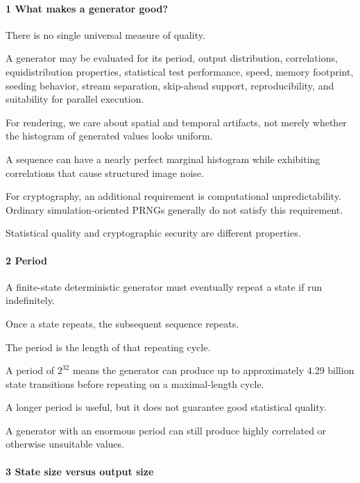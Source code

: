 \paragraph{1 What makes a generator good?}\label{02-foundations-ii-ch029-what-makes-a-generator-good}

\hypertarget{02-foundations-ii-ch029-what-makes-a-generator-good}{}

There is no single universal measure of quality.

A generator may be evaluated for its period, output distribution, correlations, equidistribution properties, statistical test performance, speed, memory footprint, seeding behavior, stream separation, skip-ahead support, reproducibility, and suitability for parallel execution.

For rendering, we care about spatial and temporal artifacts, not merely whether the histogram of generated values looks uniform.

A sequence can have a nearly perfect marginal histogram while exhibiting correlations that cause structured image noise.

For cryptography, an additional requirement is computational unpredictability. Ordinary simulation-oriented PRNGs generally do not satisfy this requirement.

Statistical quality and cryptographic security are different properties.

\paragraph{2 Period}\label{02-foundations-ii-ch029-period}

\hypertarget{02-foundations-ii-ch029-period}{}

A finite-state deterministic generator must eventually repeat a state if run indefinitely.

Once a state repeats, the subsequent sequence repeats.

The period is the length of that repeating cycle.

A period of \(2^{32}\) means the generator can produce up to approximately 4.29 billion state transitions before repeating on a maximal-length cycle.

A longer period is useful, but it does not guarantee good statistical quality.

A generator with an enormous period can still produce highly correlated or otherwise unsuitable values.

\paragraph{3 State size versus output size}\label{02-foundations-ii-ch029-state-size-versus-output-size}

